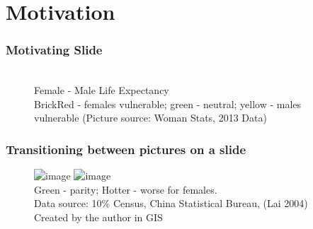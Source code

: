 
\begin{frame}
\titlepage %
\end{frame}






\section{Motivation} 


\begin{frame}[label=motivatingslide]
\frametitle{Motivating Slide }
\begin{figure}[H]  %
\\
{\tiny Female - Male Life Expectancy\\
BrickRed - females vulnerable; green - neutral; yellow - males vulnerable}
\tiny{(Picture source: Woman Stats, 2013 Data)}
\label{fig:speciation}
\end{figure}
\end{frame}


\begin{frame}[label = pictransition]
\frametitle{Transitioning between pictures on a slide }
\begin{figure}
    \begin{center}
\includegraphics<1>[width=.7\linewidth]{figures/ECON-412/gdp_pc_le_1950.png}
\includegraphics<2>[width=.7\linewidth]{figures/ECON-412/gdp_pc_le_2019.png}
\\
{\tiny Green - parity; Hotter - worse for females.\\
Data source: 10\% Census, China Statistical Bureau, (Lai 2004)\\
Created by the author in GIS}
    \end{center}
\end{figure}
\end{frame}


